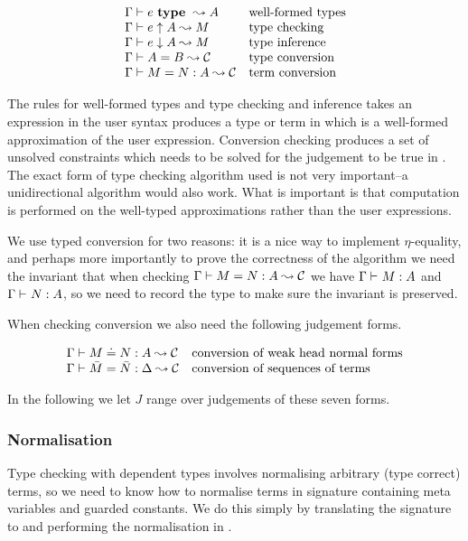 \[\begin{array}{ll}
    {\Gamma} \vdash {e} ~ \mathbf{type} ~ \leadsto {A} & \mbox{well-formed types} \\
    {\Gamma} \vdash {e} \uparrow {A} \leadsto {M} & \mbox{type checking} \\
    {\Gamma} \vdash {e} \downarrow {A} \leadsto {M} & \mbox{type inference} \\
    {\Gamma} \vdash {A} = {B} \leadsto {\mathcal{C}} & \mbox{type conversion} \\
    {\Gamma} \vdash {M} = {N} : {A} \leadsto {\mathcal{C}} & \mbox{term conversion} \\
\end{array}\]

The rules for well-formed types and type checking and inference takes an
expression in the user syntax produces a type or term in {\Core} which is a
well-formed approximation of the user expression. Conversion checking produces
a set of unsolved constraints which needs to be solved for the judgement to be
true in {\Core}. The exact form of type checking algorithm used is not very
important--a unidirectional algorithm would also work. What is important is
that computation is performed on the well-typed approximations rather than the
user expressions.

We use typed conversion for two reasons: it is a nice way to implement
$\eta$-equality, and perhaps more importantly to prove the correctness of the
algorithm we need the invariant that when checking ${\Gamma} \vdash {M} = {N} : {A} \leadsto {\mathcal{C}}$ we have
${\Gamma} \vdash_{} {M} : {A}$ and ${\Gamma} \vdash_{} {N} : {A}$, so we need to record the
type to make sure the invariant is preserved.

When checking conversion we also need the following judgement forms.

\[\begin{array}{ll}
    {\Gamma} \vdash {M} \doteq {N} : {A} \leadsto {\mathcal{C}} & \mbox{conversion of weak head normal forms} \\
    {\Gamma} \vdash {\bar M} = {\bar N} : {\Delta} \leadsto {\mathcal{C}} & \mbox{conversion of sequences of terms} \\
\end{array}\]

In the following we let $J$ range over judgements of these seven forms.

\subsubsection{Normalisation}

Type checking with dependent types involves normalising arbitrary (type
correct) terms, so we need to know how to normalise terms in signature
containing meta variables and guarded constants. We do this simply by
translating the signature to {\Core} and performing the normalisation in
{\Core}.

